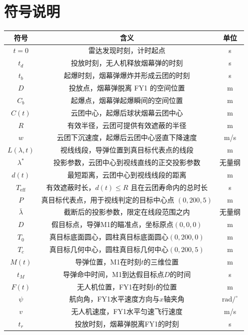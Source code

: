 \documentclass[12pt,a4paper]{article}
\begin{document}
	\section{符号说明}
	\begin{table}[H]
		\centering
		\begin{tabular}{ccc}
			\toprule
			符号 & 含义 & 单位 \\
			\midrule
			$t=0$ & 雷达发现时刻，计时起点 & s \\
			$t_d$ & 投放时刻，无人机释放烟幕弹的时刻 & s \\
			$t_b$ & 起爆时刻，烟幕弹爆炸并形成云团的时刻 & s \\
			$D$ & 投放点，烟幕弹脱离 FY1 的空间位置 & m \\
			$C_b$ & 起爆点，烟幕弹起爆瞬间的空间位置 & m \\
			$C(t)$ & 云团中心，起爆后球状烟幕云团中心 & m \\
			$R$ & 有效半径，云团可提供有效遮蔽的半径 & m \\
			$w$ & 云团下沉速度，起爆后云团中心竖直下降速度 & m/s \\
			$L(\lambda,t)$ & 视线线段，导弹位置到真目标代表点的线段 & m \\
			$\lambda^*$ & 投影参数，云团中心到视线直线的正交投影参数 & 无量纲 \\
			$d(t)$ & 最短距离，云团中心到视线线段的距离 & m \\
			$T_\mathrm{eff}$ & 有效遮蔽时长，$d(t)\le R$ 且在云团寿命内的总时长 & s \\
			$P$ & 真目标代表点，用于视线判定的目标中心点 $(0,200,5)$ & m \\
			$\bar{\lambda}$ & 截断后的投影参数，限定在线段范围之内 & 无量纲 \\
			$D$ & 假目标点，导弹M1的瞄准点，坐标原点$(0,0,0)$ & m \\
			$T_0$ & 真目标底面圆心，圆柱真目标底面圆心$(0,200,0)$ & m \\
			$T_c$ & 真目标几何中心，圆柱真目标几何中心$(0,200,5)$ & m \\
			$M(t)$ & 导弹位置，M1在时刻$t$的三维位置 & m \\
			$t_M$ & 导弹命中时间，M1到达假目标点$D$的时间 & s \\
			$F(t)$ & 无人机位置，FY1在时刻$t$的位置 & m \\
			$\psi$ & 航向角，FY1水平速度方向与$x$轴夹角 & $\mathrm{rad}/^\circ$ \\
			$v$ & 无人机速度，FY1水平匀速飞行速度 & m/s \\
			$t_r$ & 投放时刻，烟幕弹脱离FY1的时刻 & s\\
			\bottomrule
		\end{tabular}
		\label{tab:symbol}
	\end{table}
\end{document}

